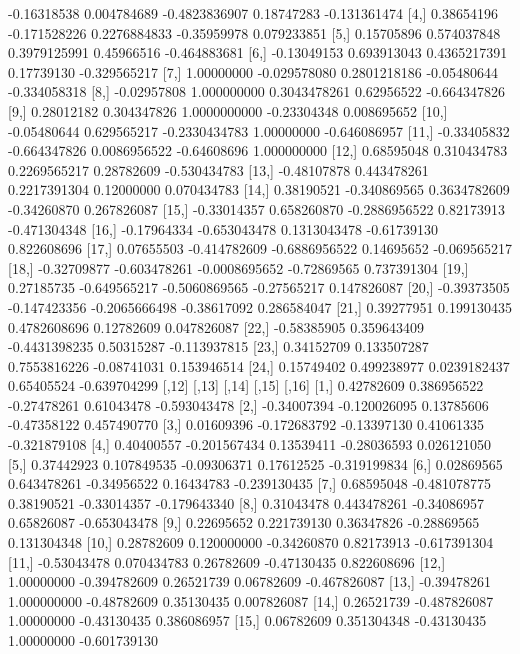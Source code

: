\documentclass[a4paper]{ article}
\begin{document}
\begin{table}[H]
\begin{Schunk}
\begin{Soutput}
 [3,] -0.16318538  0.004784689 -0.4823836907  0.18747283 -0.131361474
 [4,]  0.38654196 -0.171528226  0.2276884833 -0.35959978  0.079233851
 [5,]  0.15705896  0.574037848  0.3979125991  0.45966516 -0.464883681
 [6,] -0.13049153  0.693913043  0.4365217391  0.17739130 -0.329565217
 [7,]  1.00000000 -0.029578080  0.2801218186 -0.05480644 -0.334058318
 [8,] -0.02957808  1.000000000  0.3043478261  0.62956522 -0.664347826
 [9,]  0.28012182  0.304347826  1.0000000000 -0.23304348  0.008695652
[10,] -0.05480644  0.629565217 -0.2330434783  1.00000000 -0.646086957
[11,] -0.33405832 -0.664347826  0.0086956522 -0.64608696  1.000000000
[12,]  0.68595048  0.310434783  0.2269565217  0.28782609 -0.530434783
[13,] -0.48107878  0.443478261  0.2217391304  0.12000000  0.070434783
[14,]  0.38190521 -0.340869565  0.3634782609 -0.34260870  0.267826087
[15,] -0.33014357  0.658260870 -0.2886956522  0.82173913 -0.471304348
[16,] -0.17964334 -0.653043478  0.1313043478 -0.61739130  0.822608696
[17,]  0.07655503 -0.414782609 -0.6886956522  0.14695652 -0.069565217
[18,] -0.32709877 -0.603478261 -0.0008695652 -0.72869565  0.737391304
[19,]  0.27185735 -0.649565217 -0.5060869565 -0.27565217  0.147826087
[20,] -0.39373505 -0.147423356 -0.2065666498 -0.38617092  0.286584047
[21,]  0.39277951  0.199130435  0.4782608696  0.12782609  0.047826087
[22,] -0.58385905  0.359643409 -0.4431398235  0.50315287 -0.113937815
[23,]  0.34152709  0.133507287  0.7553816226 -0.08741031  0.153946514
[24,]  0.15749402  0.499238977  0.0239182437  0.65405524 -0.639704299
            [,12]        [,13]       [,14]       [,15]        [,16]
 [1,]  0.42782609  0.386956522 -0.27478261  0.61043478 -0.593043478
 [2,] -0.34007394 -0.120026095  0.13785606 -0.47358122  0.457490770
 [3,]  0.01609396 -0.172683792 -0.13397130  0.41061335 -0.321879108
 [4,]  0.40400557 -0.201567434  0.13539411 -0.28036593  0.026121050
 [5,]  0.37442923  0.107849535 -0.09306371  0.17612525 -0.319199834
 [6,]  0.02869565  0.643478261 -0.34956522  0.16434783 -0.239130435
 [7,]  0.68595048 -0.481078775  0.38190521 -0.33014357 -0.179643340
 [8,]  0.31043478  0.443478261 -0.34086957  0.65826087 -0.653043478
 [9,]  0.22695652  0.221739130  0.36347826 -0.28869565  0.131304348
[10,]  0.28782609  0.120000000 -0.34260870  0.82173913 -0.617391304
[11,] -0.53043478  0.070434783  0.26782609 -0.47130435  0.822608696
[12,]  1.00000000 -0.394782609  0.26521739  0.06782609 -0.467826087
[13,] -0.39478261  1.000000000 -0.48782609  0.35130435  0.007826087
[14,]  0.26521739 -0.487826087  1.00000000 -0.43130435  0.386086957
[15,]  0.06782609  0.351304348 -0.43130435  1.00000000 -0.601739130

\end{Soutput}
\end{Schunk}
\end{table}
\end{document}
